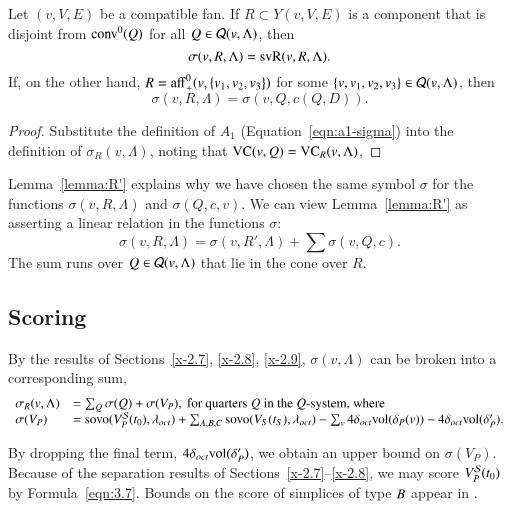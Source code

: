 \begin{lemma}
Let $(v,V,E)$ be a compatible fan.  If $R\subset Y(v,V,E)$
is a component that is disjoint from ${\operatorname{conv}}^0(Q)$ for all 
$Q\in{\mathcal Q}(v,\Lambda)$, then
   $$
   \sigma(v,R,\Lambda) = {\operatorname{svR}}(v,R,\Lambda).
   $$
If, on the other hand, $R = {\operatorname{aff}}_+^0(v,\{v_1,v_2,v_3\})$ for
some $\{v,v_1,v_2,v_3\}\in{\mathcal Q}(v,\Lambda)$, then
   $$  
   \sigma(v,R,\Lambda) =  \sigma(v,Q,c(Q,D)).
   $$
\end{lemma}

\begin{proof} Substitute the definition of $A_1$
(Equation~\ref{eqn:a1-sigma}) into the definition of
$\sigma_R(v,\Lambda)$, noting that ${\operatorname{VC}}(v,Q) 
= {\operatorname{VC}}_{R}(v,\Lambda)$,
\end{proof}

\begin{remark}   Lemma~\ref{lemma:R'} explains why we have chosen
the same symbol $\sigma$ for the functions $\sigma(v,R,\Lambda)$ and
$\sigma(Q,c,v)$.  We can view Lemma~\ref{lemma:R'} as asserting a
linear relation in the functions $\sigma$:
   $$\sigma(v,R,\Lambda) = \sigma(v,R',\Lambda) + \sum \sigma(v,Q,c).$$
The sum runs over $Q\in{\mathcal Q}(v,\Lambda)$ that lie in the cone over $R$.
\end{remark}

\subsection{Scoring}

By the results of Sections~\ref{x-2.7}, \ref{x-2.8}, \ref{x-2.9},
$\sigma(v,\Lambda)$ can be broken into a corresponding sum,
    $$
    \begin{array}{lll}
    \sigma_R(v,\Lambda) &= \sum_Q \sigma(Q) + \sigma(V_P),
                \hbox{ for quarters $Q$ in the $Q$-system, where}\\
    \sigma(V_P) &= {\operatorname{sovo}}(V^{{\mathcal S}}_P(t_0),\lambda_{oct})+  \sum_{A,B,C} {\operatorname{sovo}}(V_S(t_S),\lambda_{oct})
        - \sum_v 4\delta_{oct}{\operatorname{vol}}(\delta_P(v)) - 4\delta_{oct}{\operatorname{vol}}(\delta'_P).\\
    \end{array}
    $$

By dropping the final term, $4\delta_{oct}{\operatorname{vol}}(\delta'_P)$, we obtain
an upper bound on $\sigma(V_P)$.  Because of the separation
results of Sections~\ref{x-2.7}--\ref{x-2.8},  we may score
$V^{{\mathcal S}}_P(t_0)$ by Formula~\ref{eqn:3.7}. Bounds on the score of
simplices of type $B$ appear in .



